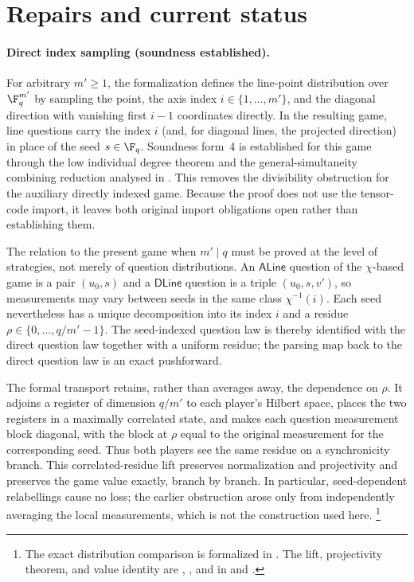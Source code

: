 \documentclass[11pt]{article}
\begin{document}
\section{Repairs and current status}

\paragraph{Direct index sampling (soundness established).}
For arbitrary $m' \ge 1$, the formalization defines the line-point
distribution over $\F_q^{m'}$ by sampling the point, the axis index
$i \in \{1,\ldots,m'\}$, and the diagonal direction with vanishing first
$i-1$ coordinates directly.  In the resulting game, line questions carry
the index $i$ (and, for diagonal lines, the projected direction) in place
of the seed $s \in \F_q$.  Soundness form~4 is established for this game
through the low individual degree theorem and the general-simultaneity
combining reduction analysed in \cite{gap:qpbt_ld-simultaneous-sandwich}.
This removes the divisibility obstruction for the
auxiliary directly indexed game.  Because the proof does not use the
tensor-code import, it leaves both original import obligations open rather
than establishing them.

The relation to the present game when $m' \mid q$ must be proved at the level
of strategies, not merely of question distributions.  An
$\mathsf{ALine}$ question of the $\chi$-based game is a pair $(u_0,s)$ and a
$\mathsf{DLine}$ question is a triple $(u_0,s,v')$, so measurements may vary
between seeds in the same class $\chi^{-1}(i)$.  Each seed nevertheless has a
unique decomposition into its index $i$ and a residue
$\rho\in\{0,\ldots,q/m'-1\}$.  The seed-indexed question law is thereby
identified with the direct question law together with a uniform residue; the
parsing map back to the direct question law is an exact pushforward.

The formal transport retains, rather than averages away, the dependence on
$\rho$.  It adjoins a register of dimension $q/m'$ to each player's Hilbert
space, places the two registers in a maximally correlated state, and makes
each question measurement block diagonal, with the block at $\rho$ equal to
the original measurement for the corresponding seed.  Thus both players see
the same residue on a synchronicity branch.  This correlated-residue lift
preserves normalization and projectivity and preserves the game value exactly,
branch by branch.  In particular, seed-dependent relabellings cause no loss;
the earlier obstruction arose only from independently averaging the local
measurements, which is not the construction used here.%
\footnote{The exact distribution comparison is formalized in
.
The lift, projectivity theorem, and value identity are
,
, and
 in
 and
.}
\end{document}
